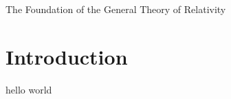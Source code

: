 \paperheader
	{The Foundation of the General Theory of Relativity}
	{}
	{}


\section{Introduction}
hello world